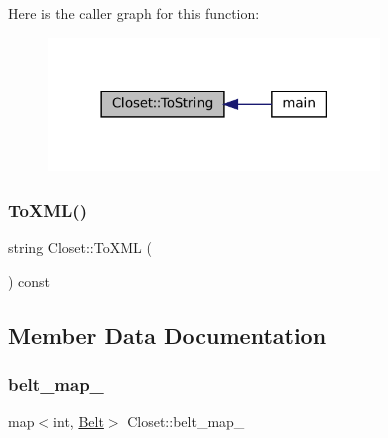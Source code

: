 Here is the caller graph for this function\+:\nopagebreak
\begin{figure}[H]
\begin{center}
\leavevmode
\includegraphics[width=249pt]{classCloset_a3bad65dd75ada9a484eb7f78ebfa3b2a_icgraph}
\end{center}
\end{figure}
\mbox{\label{classCloset_a7642f749dfd4ad11a83c2cab5a3bdae2}} 
\subsubsection{\texorpdfstring{To\+X\+M\+L()}{ToXML()}}
{\footnotesize\ttfamily string Closet\+::\+To\+X\+ML (\begin{DoxyParamCaption}{ }\end{DoxyParamCaption}) const}



\subsection{Member Data Documentation}
\mbox{\label{classCloset_a0631fe46e3c955109a613e1cd1d2cb52}} 
\subsubsection{\texorpdfstring{belt\+\_\+map\+\_\+}{belt\_map\_}}
{\footnotesize\ttfamily map$<$int, \mbox{\hyperlink{classBelt}{Belt}}$>$ Closet\+::belt\+\_\+map\+\_\+\hspace{0.3cm}{\ttfamily [private]}}

\mbox{\label{classCloset_a3c06676b90e6ebe31d6dd276f2f0bcef}} 
